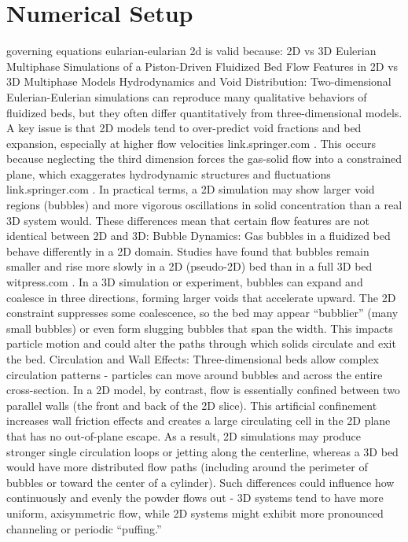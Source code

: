 \section{Numerical Setup}
governing equations eularian-eularian
2d is valid because:
2D vs 3D Eulerian Multiphase Simulations of a Piston-Driven Fluidized Bed
Flow Features in 2D vs 3D Multiphase Models
Hydrodynamics and Void Distribution: Two-dimensional Eulerian-Eulerian simulations can reproduce many qualitative behaviors of fluidized beds, but they often differ quantitatively from three-dimensional models. A key issue is that 2D models tend to over-predict void fractions and bed expansion, especially at higher flow velocities
link.springer.com
. This occurs because neglecting the third dimension forces the gas-solid flow into a constrained plane, which exaggerates hydrodynamic structures and fluctuations
link.springer.com
. In practical terms, a 2D simulation may show larger void regions (bubbles) and more vigorous oscillations in solid concentration than a real 3D system would. These differences mean that certain flow features are not identical between 2D and 3D:
Bubble Dynamics: Gas bubbles in a fluidized bed behave differently in a 2D domain. Studies have found that bubbles remain smaller and rise more slowly in a 2D (pseudo-2D) bed than in a full 3D bed
witpress.com
. In a 3D simulation or experiment, bubbles can expand and coalesce in three directions, forming larger voids that accelerate upward. The 2D constraint suppresses some coalescence, so the bed may appear “bubblier” (many small bubbles) or even form slugging bubbles that span the width. This impacts particle motion and could alter the paths through which solids circulate and exit the bed.
Circulation and Wall Effects: Three-dimensional beds allow complex circulation patterns - particles can move around bubbles and across the entire cross-section. In a 2D model, by contrast, flow is essentially confined between two parallel walls (the front and back of the 2D slice). This artificial confinement increases wall friction effects and creates a large circulating cell in the 2D plane that has no out-of-plane escape. As a result, 2D simulations may produce stronger single circulation loops or jetting along the centerline, whereas a 3D bed would have more distributed flow paths (including around the perimeter of bubbles or toward the center of a cylinder). Such differences could influence how continuously and evenly the powder flows out - 3D systems tend to have more uniform, axisymmetric flow, while 2D systems might exhibit more pronounced channeling or periodic “puffing.”
